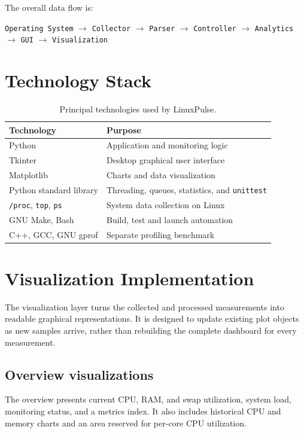 \documentclass[11pt,a4paper]{article}
\begin{document}
The overall data flow is:

\begin{center}
\texttt{Operating System}
$\rightarrow$ \texttt{Collector}
$\rightarrow$ \texttt{Parser}
$\rightarrow$ \texttt{Controller}
$\rightarrow$ \texttt{Analytics}
$\rightarrow$ \texttt{GUI}
$\rightarrow$ \texttt{Visualization}
\end{center}

\section{Technology Stack}

\begin{table}[H]
\centering
\begin{tabular}{ll}
\toprule
\textbf{Technology} & \textbf{Purpose} \\
\midrule
Python & Application and monitoring logic \\
Tkinter & Desktop graphical user interface \\
Matplotlib & Charts and data visualization \\
Python standard library & Threading, queues, statistics, and \texttt{unittest} \\
\texttt{/proc}, \texttt{top}, \texttt{ps} & System data collection on Linux \\
GNU Make, Bash & Build, test and launch automation \\
C++, GCC, GNU gprof & Separate profiling benchmark \\
\bottomrule
\end{tabular}
\caption{Principal technologies used by LinuxPulse.}
\end{table}

\section{Visualization Implementation}

The visualization layer turns the collected and processed measurements into
readable graphical representations. It is designed to update existing plot
objects as new samples arrive, rather than rebuilding the complete dashboard
for every measurement.

\subsection{Overview visualizations}

The overview presents current CPU, RAM, and swap utilization, system load,
monitoring status, and a metrics index. It also includes historical CPU and
memory charts and an area reserved for per-core CPU utilization.
\end{document}
